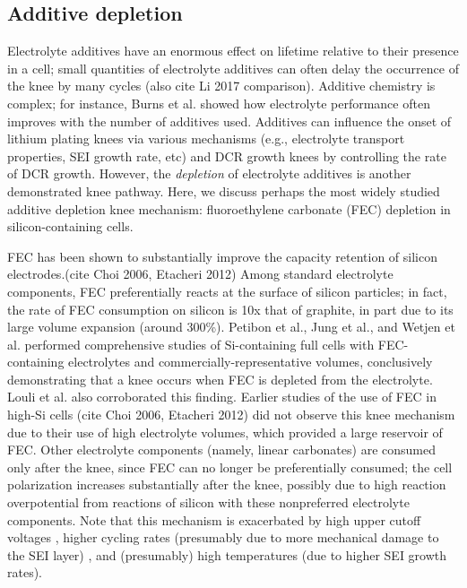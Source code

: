 \documentclass{article}
\begin{document}
\subsection{Additive depletion}

Electrolyte additives have an enormous effect on lifetime relative to their presence in a cell; small quantities of electrolyte additives can often delay the occurrence of the knee by many cycles\cite{ma_editors_2019} (also cite Li 2017 comparison). Additive chemistry is complex; for instance, Burns et al.\cite{burns_predicting_2013} showed how electrolyte performance often improves with the number of additives used. Additives can influence the onset of lithium plating knees via various mechanisms (e.g., electrolyte transport properties, SEI growth rate, etc) and DCR growth knees by controlling the rate of DCR growth\cite{ma_editors_2019}. However, the \emph{depletion} of electrolyte additives is another demonstrated knee pathway. Here, we discuss perhaps the most widely studied additive depletion knee mechanism: fluoroethylene carbonate (FEC) depletion in silicon-containing cells.

FEC has been shown to substantially improve the capacity retention of silicon electrodes.(cite Choi 2006, Etacheri 2012)
Among standard electrolyte components, FEC preferentially reacts at the surface of silicon particles; in fact, the rate of FEC consumption on silicon is 10x that of graphite, in part due to its large volume expansion (around 300\%).\cite{wetjen_differentiating_2017}
Petibon et al.\cite{petibon_studies_2016},
Jung et al.\cite{jung_consumption_2016},
and Wetjen et al.\cite{wetjen_differentiating_2017}
performed comprehensive studies of Si-containing full cells with FEC-containing electrolytes and commercially-representative volumes,
conclusively demonstrating that a knee occurs when FEC is depleted from the electrolyte.
Louli et al.\cite{louli_operando_2019} also corroborated this finding.
Earlier studies of the use of FEC in high-Si cells (cite Choi 2006, Etacheri 2012) did not observe this knee mechanism due to their use of high electrolyte volumes, which provided a large reservoir of FEC.
Other electrolyte components (namely, linear carbonates) are consumed only after the knee, since FEC can no longer be preferentially consumed\cite{petibon_studies_2016}; the cell polarization increases substantially after the knee\cite{petibon_studies_2016, jung_consumption_2016, wetjen_differentiating_2017}, possibly due to high reaction overpotential from reactions of silicon with these nonpreferred electrolyte components.
Note that this mechanism is exacerbated by high upper cutoff voltages \cite{petibon_studies_2016}, higher cycling rates (presumably due to more mechanical damage to the SEI layer) \cite{petibon_studies_2016}, and (presumably) high temperatures (due to higher SEI growth rates).
\end{document}
